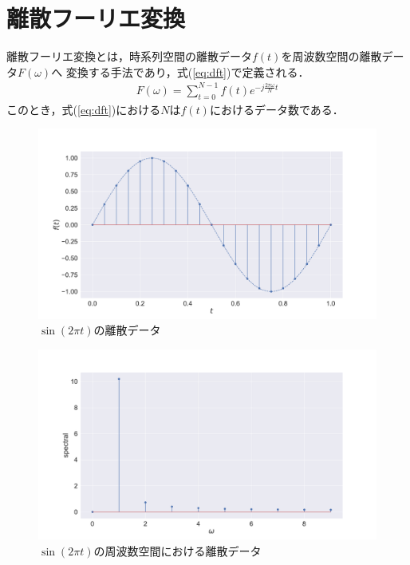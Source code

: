 \section{離散フーリエ変換}

離散フーリエ変換とは，時系列空間の離散データ$f(t)$を周波数空間の離散データ$F(\omega)$へ
変換する手法であり，式(\ref{eq:dft})で定義される．
\begin{align}
  F(\omega) = \sum_{t=0}^{N-1} f(t) e^{-j \frac{2 \pi \omega}{N} t} \label{eq:dft}
\end{align}
このとき，式(\ref{eq:dft})における$N$は$f(t)$におけるデータ数である．


\begin{figure}[h]
  \includegraphics[clip, width=\textwidth]{figure/sin.pdf}
  \caption{$\sin (2 \pi t)$の離散データ}
\end{figure}

\begin{figure}[h]
  \includegraphics[clip, width=\textwidth]{figure/sin_dft.pdf}
  \caption{$\sin (2 \pi t)$の周波数空間における離散データ}
\end{figure}
